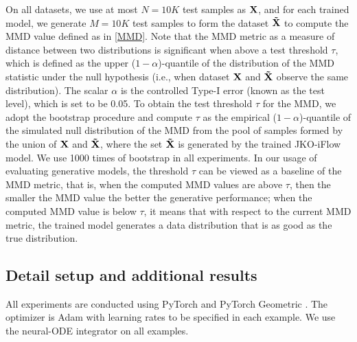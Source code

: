 \documentclass{article}
\theoremstyle{remark}
\theoremstyle{plain}
\newcommand{\JKO}{JKO-iFlow}
\newcommand{\revold}[1]{{\color{black}#1}}
\begin{document}
{\revold{On all datasets, 
we use at most $N=10K$ test samples as $\bf{X}$,
and for each trained model, 
we generate $M=10K$ test samples to form the dataset $\bf{\tilde{X}}$ to compute the MMD value defined as in \eqref{MMD}.}
Note that the MMD metric as a measure of distance between two distributions is significant when above a test threshold $\tau$, which is defined as the upper ($1-\alpha$)-quantile of the distribution of the MMD statistic under the null hypothesis
(i.e., when dataset $\bf{X}$ and $\bf{\tilde{X}}$ observe the same distribution). 
The scalar $\alpha$ is the controlled Type-I error (known as the test level), which is set to be 0.05.
\revold{
To obtain the test threshold $\tau$ for the MMD, we adopt the bootstrap procedure \cite{arcones1992bootstrap,Gretton2012AKT}
and compute $\tau$ as the empirical ($1-\alpha$)-quantile of the simulated null distribution of the MMD from the pool of samples formed by the union of $\bf{X}$ and $\bf{\tilde{X}}$,
where the set $\bf{\tilde{X}}$ is generated by the trained \JKO{} model. 
We use 1000 times of bootstrap in all experiments.}
In our usage of evaluating generative models, the threshold $\tau$ can be viewed as a baseline of the MMD metric, that is, when the computed MMD values are above $\tau$, then the smaller the MMD value the better the generative performance; when the computed MMD value is below $\tau$, it means that with respect to the current MMD metric, the trained model generates a data distribution that is as good as the true distribution. 


\subsection{Detail setup and additional results}\label{sec:additional_results}


All experiments are conducted using PyTorch \citep{NEURIPS2019_9015} and PyTorch Geometric \citep{Fey/Lenssen/2019}. 
The optimizer is Adam \citep{Kingma2015AdamAM} with learning rates to be specified in each example. We use the neural-ODE
integrator \citep[adjoint method]{FFJORD} on all examples.


}
\end{document}
